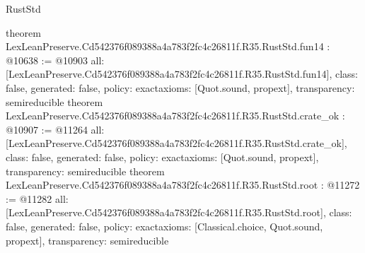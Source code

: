 \begin{lexlean}{RustStd}
\begin{coremodule}
{}
theorem LexLeanPreserve.Cd542376f089388a4a783f2fc4c26811f.R35.RustStd.fun14 : @10638 := @10903 {
  all: [LexLeanPreserve.Cd542376f089388a4a783f2fc4c26811f.R35.RustStd.fun14],
  class: false,
  generated: false,
  policy: exact{axioms: [Quot.sound, propext]},
  transparency: semireducible
}
theorem LexLeanPreserve.Cd542376f089388a4a783f2fc4c26811f.R35.RustStd.crate_ok : @10907 := @11264 {
  all: [LexLeanPreserve.Cd542376f089388a4a783f2fc4c26811f.R35.RustStd.crate_ok],
  class: false,
  generated: false,
  policy: exact{axioms: [Quot.sound, propext]},
  transparency: semireducible
}
theorem LexLeanPreserve.Cd542376f089388a4a783f2fc4c26811f.R35.RustStd.root : @11272 := @11282 {
  all: [LexLeanPreserve.Cd542376f089388a4a783f2fc4c26811f.R35.RustStd.root],
  class: false,
  generated: false,
  policy: exact{axioms: [Classical.choice, Quot.sound, propext]},
  transparency: semireducible
}


\end{coremodule}
\end{lexlean}
